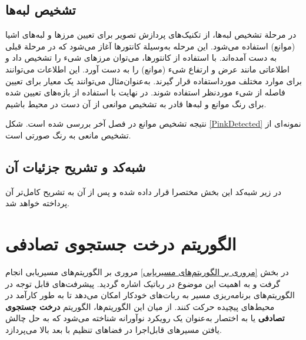 \subsection{تشخیص لبه‌ها}

در مرحلة تشخیص لبه‌ها، از تکنیک‌های پردازش تصویر برای تعیین مرزها و لبه‌های اشیا (موانع) استفاده می‌شود. این مرحله به‌وسیلة کانتورها آغاز می‌شود که در مرحلة قبلی به دست آمده‌اند. با استفاده از کانتورها، می‌توان مرزهای شیء را تشخیص داد و اطلاعاتی مانند عرض و ارتفاع شیء (موانع) را به دست آورد. این اطلاعات می‌توانند برای موارد مختلف مورداستفاده قرار گیرند.
به‌عنوان‌مثال می‌توانند یک معیار برای تعیین فاصله از شیء موردنظر استفاده شوند.
در نهایت با استفاده از بازه‌های تعیین شده برای رنگ‌ موانع و لبه‌ها قادر به تشخیص موانعی از آن دست در محیط باشیم.

نتیجه تشخیص موانع در فصل آخر بررسی شده است. شکل
\ref{PinkDetected}
نمونه‌ای از تشخیص مانعی به رنگ صورتی است. 

\subsection{شبه‌کد و تشریح جزئیات آن}
در زیر شبه‌کد این بخش مختصرا قرار داده شده و پس از آن به تشریح کامل‌تر آن پرداخته خواهد شد.
\section*{}
\begin{latin}
	
\end{latin}

\section{الگوریتم درخت جستجوی تصادفی}
در بخش
\ref{مروری بر الگوریتم‌های مسیریابی}
مروری بر الگوریتم‌های مسیریابی انجام گرفت و به اهمیت این موضوع در رباتیک اشاره گردید.
پیشرفت‌های قابل توجه در الگوریتم‌های برنامه‌ریزی مسیر به ربات‌های خودکار امکان می‌دهد تا به طور کارآمد در محیط‌های پیچیده حرکت کنند. از میان این الگوریتم‌ها، الگوریتم 
\textbf{درخت جستجوی تصادفی}
\noindent\unskip{}
یا به اختصار
به‌عنوان یک رویکرد نوآورانه شناخته می‌شود که به حل چالش یافتن مسیرهای قابل‌اجرا در فضاهای تنظیم با بعد بالا می‌پردازد.

